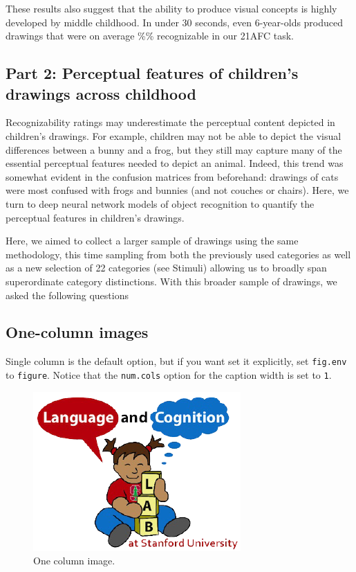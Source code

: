 \documentclass[10pt, letterpaper]{article}
\newenvironment{CodeChunk}{}{}
\begin{document}
These results also suggest that the ability to produce visual concepts
is highly developed by middle childhood. In under 30 seconds, even
6-year-olds produced drawings that were on average \%\% recognizable in
our 21AFC task.

\subsection{Part 2: Perceptual features of children's drawings across
childhood}\label{part-2-perceptual-features-of-childrens-drawings-across-childhood}

Recognizability ratings may underestimate the perceptual content
depicted in children's drawings. For example, children may not be able
to depict the visual differences between a bunny and a frog, but they
still may capture many of the essential perceptual features needed to
depict an animal. Indeed, this trend was somewhat evident in the
confusion matrices from beforehand: drawings of cats were most confused
with frogs and bunnies (and not couches or chairs). Here, we turn to
deep neural network models of object recognition to quantify the
perceptual features in children's drawings.

Here, we aimed to collect a larger sample of drawings using the same
methodology, this time sampling from both the previously used categories
as well as a new selection of 22 categories (see Stimuli) allowing us to
broadly span superordinate category distinctions. With this broader
sample of drawings, we asked the following questions

\subsection{One-column images}\label{one-column-images}

Single column is the default option, but if you want set it explicitly,
set \texttt{fig.env} to \texttt{figure}. Notice that the
\texttt{num.cols} option for the caption width is set to \texttt{1}.

\begin{CodeChunk}
\begin{figure}[H]

{\centering \includegraphics{figs/image-1} 

}

\caption[One column image]{One column image.}\label{fig:image}
\end{figure}
\end{CodeChunk}
\end{document}
